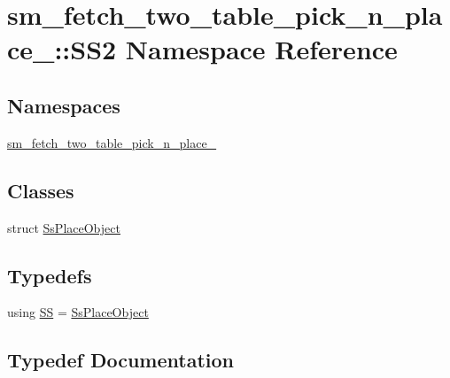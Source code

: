 \hypertarget{namespacesm__fetch__two__table__pick__n__place__1_1_1SS2}{}\section{sm\+\_\+fetch\+\_\+two\+\_\+table\+\_\+pick\+\_\+n\+\_\+place\+\_\+:\+:S\+S2 Namespace Reference}
\label{namespacesm__fetch__two__table__pick__n__place__1_1_1SS2}
\subsection*{Namespaces}
\begin{DoxyCompactItemize}
\item 
 \hyperlink{namespacesm__fetch__two__table__pick__n__place__1_1_1SS2_1_1sm__fetch__two__table__pick__n__place__1}{sm\+\_\+fetch\+\_\+two\+\_\+table\+\_\+pick\+\_\+n\+\_\+place\+\_}
\end{DoxyCompactItemize}
\subsection*{Classes}
\begin{DoxyCompactItemize}
\item 
struct \hyperlink{structsm__fetch__two__table__pick__n__place__1_1_1SS2_1_1SsPlaceObject}{Ss\+Place\+Object}
\end{DoxyCompactItemize}
\subsection*{Typedefs}
\begin{DoxyCompactItemize}
\item 
using \hyperlink{namespacesm__fetch__two__table__pick__n__place__1_1_1SS2_add1681efb1959d30f91011aaac2d8c91}{SS} = \hyperlink{structsm__fetch__two__table__pick__n__place__1_1_1SS2_1_1SsPlaceObject}{Ss\+Place\+Object}
\end{DoxyCompactItemize}


\subsection{Typedef Documentation}
\mbox{\label{namespacesm__fetch__two__table__pick__n__place__1_1_1SS2_add1681efb1959d30f91011aaac2d8c91}} 
